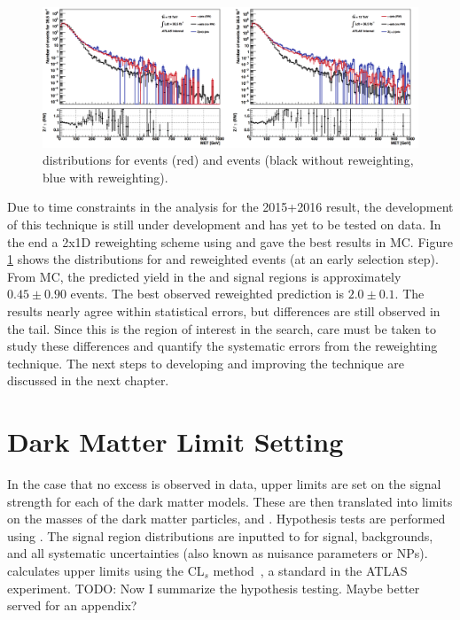 \begin{figure}[h]
\centering
\includegraphics[width=1\textwidth]{Figures/gjets.png}
\caption{\etmiss distributions for \gjets events (red) and \Zjets events (black without reweighting, blue with reweighting).}
\label{fig:gjets}
\end{figure}

Due to time constraints in the analysis for the 2015+2016 result, the development of this technique is still under development and has yet to be tested on data. In the end a 2x1D reweighting scheme using \pt and \etmissht gave the best results in MC. Figure \ref{fig:gjets} shows the \etmiss distributions for \Zjets and reweighted \gjets events (at an early selection step). From \Zjets MC, the predicted yield in the \ee and \mm signal regions is approximately $0.45 \pm 0.90$ events. The best observed reweighted \gjets prediction is $2.0 \pm 0.1$. The results nearly agree within statistical errors, but differences are still observed in the \etmiss tail. Since this is the region of interest in the \monoZ search, care must be taken to study these differences and quantify the systematic errors from the reweighting technique. The next steps to developing and improving the \gjets technique are discussed in the next chapter.

\section{Dark Matter Limit Setting}
\label{sec:limits}

In the case that no excess is observed in data, upper limits are set on the signal strength for each of the dark matter models. These are then translated into limits on the masses of the dark matter particles, \mchi and \mmed. Hypothesis tests are performed using \histfitter. The signal region \etmiss distributions are inputted to \histfitter for signal, backgrounds, and all systematic uncertainties (also known as nuisance parameters or NPs). \histfitter calculates upper limits using the CL$_{s}$ method~\cite{Cowan:2010js}, a standard in the ATLAS experiment. {\color{red}TODO: Now I summarize the hypothesis testing. Maybe better served for an appendix?}

